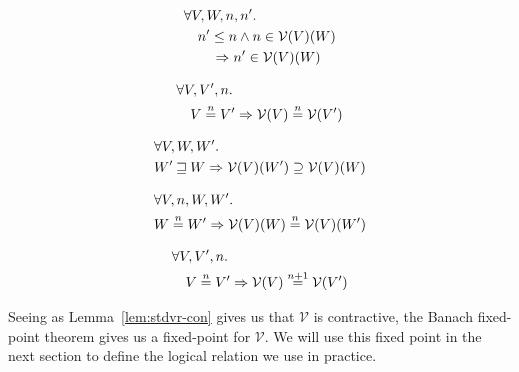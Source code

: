 \documentclass{article}
\newcommand{\nequal}[1][n]{\stackrel{\tiny{#1}}{=}}
\newcommand{\future}{\mathbin{\sqsupseteq}}
\newcommand{\asmType}{\plaindom{AsmType}}
\newcommand{\plaindom}[1]{\mathrm{#1}}
\newcommand{\intr}[2]{\mathcal{#1}}
\newcommand{\valueintr}[1]{\intr{V}{#1}}
\newcommand{\stdvr}{\valueintr{\asmType}}
\begin{document}
\begin{lemma}
\label{lem:stdvr-dc}
  \begin{align*}
    & \forall V, W, n, n' \ldotp \\
    & \quad n' \leq n \land n \in \stdvr(V)(W) \\
    & \qquad \Rightarrow n' \in \stdvr(V)(W)
  \end{align*}
\end{lemma}

\begin{lemma}
\label{lem:stdvr-ne-V}
  \begin{align*}
    & \forall V, V', n \ldotp \\
    & \quad V \nequal V' \Rightarrow \stdvr(V) \nequal \stdvr(V')
  \end{align*}
\end{lemma}

\begin{lemma}
\label{lem:stdvr-mono-world}
  \begin{align*}
    & \forall V, W, W' \ldotp \\
    & W' \future W \Rightarrow \stdvr(V)(W') \supseteq \stdvr(V)(W)
  \end{align*} 
\end{lemma}

\begin{lemma}
\label{lem:stdvr-ne-worlds}
  \begin{align*}
    & \forall V, n, W, W' \ldotp \\
    & W \nequal W' \Rightarrow \stdvr(V)(W) \nequal \stdvr(V)(W')
  \end{align*} 
\end{lemma}

\begin{lemma}
\label{lem:stdvr-con}
  \begin{align*}
    & \forall V, V', n \ldotp \\
    & \quad V \nequal V' \Rightarrow \stdvr(V) \nequal[n+1] \stdvr(V')
  \end{align*}
\end{lemma}

Seeing as Lemma~\ref{lem:stdvr-con} gives us that $\stdvr$ is contractive, the Banach fixed-point theorem gives us a fixed-point for $\stdvr$. We will use this fixed point in the next section to define the logical relation we use in practice.
\end{document}
